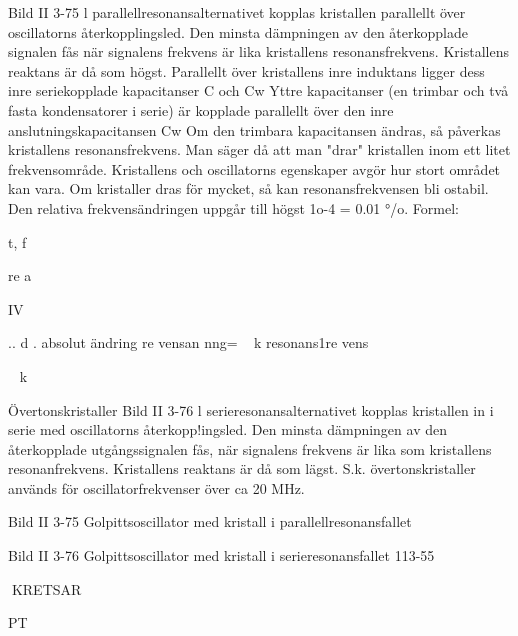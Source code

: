 {{{{Bild II 3-75
l parallellresonansalternativet kopplas
kristallen parallellt över oscillatorns återkopplingsled. Den minsta dämpningen av
den återkopplade signalen fås när signalens
frekvens är lika kristallens resonansfrekvens.
Kristallens reaktans är då som högst.
Parallellt över kristallens inre induktans
ligger dess inre seriekopplade kapacitanser
C och Cw Yttre kapacitanser (en trimbar och
två fasta kondensatorer i serie) är kopplade
parallellt över den inre anslutningskapacitansen Cw
Om den trimbara kapacitansen ändras,
så påverkas kristallens resonansfrekvens.
Man säger då att man "drar" kristallen inom
ett litet frekvensområde. Kristallens och oscillatorns egenskaper avgör hur stort området kan vara. Om kristaller dras för mycket,
så kan resonansfrekvensen bli ostabil.
Den relativa frekvensändringen uppgår
till högst 1o-4 = 0.01 °/o. Formel:

t, f

re a

IV

.. d .
absolut ändring
re vensan nng=
~ k
resonans1re vens

~ k

Övertonskristaller
Bild II 3-76
l serieresonansalternativet kopplas kristallen in i serie med oscillatorns återkopp!ingsled. Den minsta dämpningen av den
återkopplade utgångssignalen fås, när signalens frekvens är lika som kristallens resonanfrekvens. Kristallens reaktans är då som
lägst. S.k. övertonskristaller används för oscillatorfrekvenser över ca 20 MHz.

Bild II 3-75 Golpittsoscillator med kristall
i parallellresonansfallet

Bild II 3-76 Golpittsoscillator med kristall
i serieresonansfallet
113-55

KRETSAR

PT

}}}}
